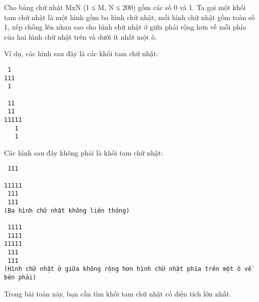 Cho bảng chữ nhật MxN (1 ≤ M, N ≤ 200) gồm các số 0 và 1. Ta gọi một       khối tam chữ nhật      là một hình gồm ba hình chữ nhật, mỗi hình chữ nhật gồm toàn số 1, xếp chồng lên nhau sao cho hình chữ nhật ở giữa phải rộng hơn về mỗi phía của hai hình chữ nhật trên và dưới ít nhất một ô.  

   Ví dụ, các hình sau đây là các khối tam chữ nhật:  
\begin{verbatim}
 1	
111
 1	
 
 11		
 11		
11111
   1		
   1		
\end{verbatim}

   Các hình sau đây không phải là khối tam chữ nhật:  
\begin{verbatim}
 111
	 				
11111
 111	
 111	
(Ba hình chữ nhật không liên thông)

 1111
 1111
11111
 111	
 111	
(Hình chữ nhật ở giữa không rộng hơn hình chữ nhật phía trên một ô về bên phải)
\end{verbatim}

   Trong bài toán này, bạn cần tìm khối tam chữ nhật có diện tích lớn nhất.
